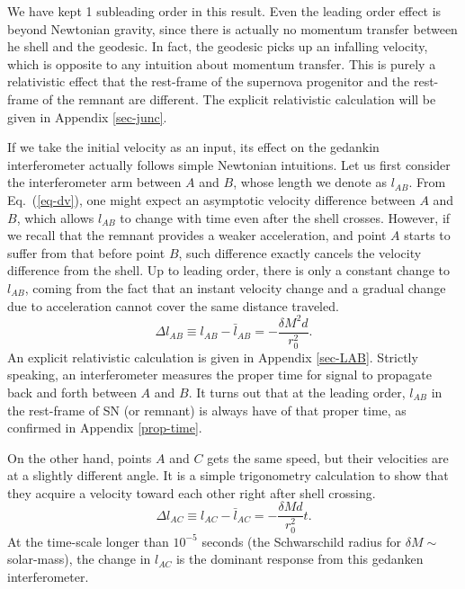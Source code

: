 \documentclass[aps,showpacs,onecolumn,floats,prd,superscriptaddress,nofootinbib]{revtex4-1}
\begin{document}
We have kept 1 subleading order in this result.
Even the leading order effect is beyond Newtonian gravity, since there is actually no momentum transfer between he shell and the geodesic.
In fact, the geodesic picks up an infalling velocity, which is opposite to any intuition about momentum transfer.
This is purely a relativistic effect that the rest-frame of the supernova progenitor and the rest-frame of the remnant are different.
The explicit relativistic calculation will be given in Appendix \ref{sec-junc}.

If we take the initial velocity as an input, its effect on the gedankin interferometer actually follows simple Newtonian intuitions.
Let us first consider the interferometer arm between $A$ and $B$, whose length we denote as $l_{AB}$.
From Eq.~(\ref{eq-dv}), one might expect an asymptotic velocity difference between $A$ and $B$, which allows $l_{AB}$ to change with time even after the shell crosses.
However, if we recall that the remnant provides a weaker acceleration, and point $A$ starts to suffer from that before point $B$, such difference exactly cancels the velocity difference from the shell.
Up to leading order, there is only a constant change to $l_{AB}$, coming from the fact that an instant velocity change and a gradual change due to acceleration cannot cover the same distance traveled.
\begin{equation}
	\Delta l_{AB} \equiv l_{AB} - \bar{l}_{AB} = - \frac{\delta M^2 d}{r_0^2}.
	\label{eq-LAB}
\end{equation}
An explicit relativistic calculation is given in Appendix \ref{sec-LAB}.
Strictly speaking, an interferometer measures the proper time for signal to propagate back and forth between $A$ and $B$.
It turns out that at the leading order, $l_{AB}$ in the rest-frame of SN (or remnant) is always have of that proper time, as confirmed in Appendix \ref{prop-time}.

On the other hand, points $A$ and $C$ gets the same speed, but their velocities are at a slightly different angle.
It is a simple trigonometry calculation to show that they acquire a velocity toward each other right after shell crossing.
\begin{equation}
	\Delta l_{AC} \equiv l_{AC} - \bar{l}_{AC} = - \frac{\delta M d}{r_0^2} t.
	\label{eq-LAC}
\end{equation}
At the time-scale longer than $10^{-5}$ seconds (the Schwarschild radius for $\delta M\sim$ solar-mass), the change in $l_{AC}$ is the dominant response from this gedanken interferometer.
\end{document}
